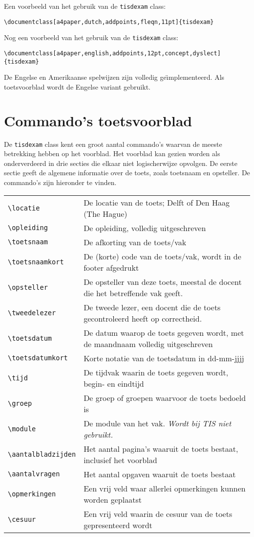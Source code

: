 \documentclass[dutch,a4paper,12pt,addpoints,fleqn,oneside]{tisdexam}
\newcommand\DocClass[1]{\texttt{#1}}
\begin{document}
\bigskip
Een voorbeeld van het gebruik van de \DocClass{tisdexam} class:
\bigskip

\verb|\documentclass[a4paper,dutch,addpoints,fleqn,11pt]{tisdexam}|
\bigskip

Nog een voorbeeld van het gebruik van de \DocClass{tisdexam} class:
\bigskip

\verb|\documentclass[a4paper,english,addpoints,12pt,concept,dyslect]{tisdexam}|
\bigskip

De Engelse en Amerikaanse spelwijzen zijn volledig
ge\"{\i}mplementeerd. Als toetsvoorblad wordt de Engelse variant gebruikt.


\section{Commando's toetsvoorblad}
\label{sec:commands}

De \DocClass{tisdexam} class kent een groot aantal commando's waarvan de meeste
betrekking hebben op het voorblad.  Het voorblad kan gezien worden als onderverdeerd
in drie secties die elkaar niet logischerwijze opvolgen. De eerste sectie geeft de
algemene informatie over de toets, zoals
toetsnaam en opsteller. De commando's zijn hieronder te vinden.
\bigskip

\begin{tabular}{lp{11.9cm}}
\verb|\locatie| & De locatie van de toets; Delft of Den Haag (The Hague) \\
\verb|\opleiding| & De opleiding, volledig uitgeschreven\\ 
\verb|\toetsnaam| & De afkorting van de toets/vak \\
\verb|\toetsnaamkort| & De (korte) code van de toets/vak, wordt in de footer afgedrukt \\ 
\verb|\opsteller| & De opsteller van deze toets, meestal de docent die het betreffende vak geeft. \\
\verb|\tweedelezer| & De tweede lezer, een docent die de toets gecontroleerd heeft op correctheid. \\
\verb|\toetsdatum| & De datum waarop de toets gegeven wordt, met de maandnaam volledig uitgeschreven \\ 
\verb|\toetsdatumkort| & Korte notatie van de toetsdatum in dd-mm-jjjj \\
\verb|\tijd|       & De tijdvak waarin de toets gegeven wordt, begin- en eindtijd \\
\verb|\groep|     & De groep of groepen waarvoor de toets bedoeld is \\ 
\verb|\module|    & De module van het vak. \textsl{Wordt bij TIS niet gebruikt.}\\
\verb|\aantalbladzijden| & Het aantal pagina's waaruit de toets bestaat, inclusief het voorblad \\
\verb|\aantalvragen| & Het aantal opgaven waaruit de toets bestaat \\
\verb|\opmerkingen| & Een vrij veld waar allerlei opmerkingen kunnen worden geplaatst \\
\verb|\cesuur| & Een vrij veld waarin de cesuur van de toets gepresenteerd wordt \\
\end{tabular}
\end{document}
